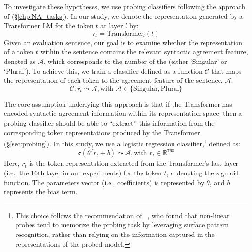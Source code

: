 To investigate these hypotheses, we use probing classifiers following the approach of \cite{giulianelli-etal-2018-hood} (\S\ref{chp:NA_tasks}). In our study, 
 we denote the representation generated by a Transformer LM for the token $t$ at layer $l$ by:
 \begin{equation}
 r_t = \text{Transformer}_l(t) 
 \end{equation}
 Given an evaluation sentence, our goal is to examine whether the representation of a token $t$ within the sentence contains the relevant syntactic agreement feature, denoted as $\mathcal{A}$, which corresponds to the number of the \cue (either `Singular' or `Plural'). To achieve this, we train a classifier defined as a function $\mathcal{C}$ that maps the representation of each token to the agreement feature of the sentence, $\mathcal{A}$:
\begin{equation}
\mathcal{C}:r_t \leadsto \mathcal{A}, \text{with } \mathcal{A} \in \{\text{Singular}, \text{Plural}\}
\end{equation}



The core assumption underlying this approach is that if the Transformer has encoded syntactic agreement information within its representation space, then a probing classifier should be able to ``extract'' this information from the corresponding token representations produced by the Transformer (\S\ref{sec:probing}). 
In this study, we use a logistic regression classifier,\footnote{This choice follows the recommendation of ~\cite{hewitt-liang-2019-designing}, who found that non-linear probes tend to memorize the probing task by leveraging surface pattern recognition, rather than relying on the information captured in the representations of the probed model.} defined as:
\begin{equation}
 \sigma(\theta^T r_t + b) \leadsto \mathcal{A}, \text{with } r_t \in \mathbb{R}^{768} 
\end{equation}
Here, $r_t$ is the token representation extracted from the Transformer's last layer (i.e., the 16th layer in our experiments) for the token $t$, $\sigma$ denoting the sigmoid function. The parameters vector (i.e., coefficients) is represented by $\theta$, and $b$ represents the bias term. 

